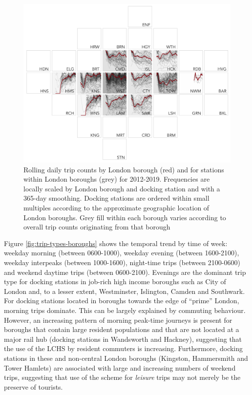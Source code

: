 \documentclass[]{article}
\begin{document}
\begin{figure}

{\centering \includegraphics[width=1\linewidth]{figures/daily_hires_station_bor_minor} 

}

\caption{Rolling daily trip counts by London borough (red) and for stations within London boroughs (grey) for 2012-2019. Frequencies are locally scaled by London borough and docking station and with a 365-day smoothing. Docking stations are ordered within small multiples according to the approximate geographic location of London boroughs. Grey fill within each borough varies according to overall trip counts originating from that borough}\label{fig:change-time-boroughs}
\end{figure}

Figure \ref{fig:trip-types-boroughs} shows the temporal trend by time of week: weekday morning (between 0600-1000), weekday evening (between 1600-2100), weekday interpeaks (between 1000-1600), night-time trips (between 2100-0600) and weekend daytime trips (between 0600-2100). Evenings are the dominant trip type for docking stations in job-rich high income boroughs such as City of London and, to a lesser extent, Westminster, Islington, Camden and Southwark.
For docking stations located in boroughs towards the edge of ``prime'' London, morning trips dominate.
This can be largely explained by commuting behaviour.
However, an increasing pattern of morning peak-time journeys is present for boroughs that contain large resident populations and that are not located at a major rail hub (docking stations in Wandsworth and Hackney), suggesting that the use of the LCHS by resident commuters is increasing.
Furthermore, docking stations in these and non-central London boroughs (Kingston, Hammersmith and Tower Hamlets) are associated with large and increasing numbers of weekend trips, suggesting that use of the scheme for \emph{leisure} trips may not merely be the preserve of tourists.
\end{document}
